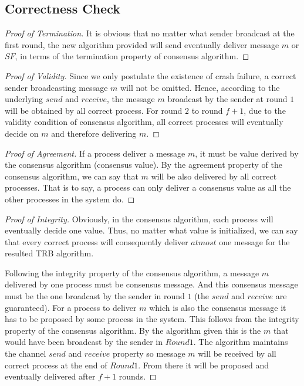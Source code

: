 \documentclass[11pt,a4paper]{article}
\begin{document}
\newpage
\subsection{Correctness Check}
\begin{proof}[Proof of Termination]
    It is obvious that no matter what sender broadcast at the first round, the
    new algorithm provided will send eventually deliver message $m$ or $SF$,
    in terms of the termination property of consensus algorithm.
\end{proof}
\begin{proof}[Proof of Validity]
Since we only postulate the existence of crash failure, a correct sender
broadcasting message $m$ will not be omitted. Hence, according to the
underlying $send$ and $receive$, the message $m$ broadcast by the sender at
 round $1$ will be obtained by all correct process. 
For round $2$ to round $f+1$, due to the validity condition of consensus
algorithm, all correct processes will eventually decide on $m$ and therefore delivering $m$.
\end{proof}
\begin{proof}[Proof of Agreement]
If a process deliver a message $m$, it must be value derived by the consensus
algorithm (consensus value). By the agreement 
property of the consensus algorithm, we can say that $m$ will be also
delivered by all correct processes. That is to say, a process can only deliver
a consensus value as all the other processes in the system do.
\end{proof}

\begin{proof}[Proof of Integrity]
Obviously, in the consensus algorithm, each process will eventually decide one
value.  Thus, no matter what value is initialized, we can say that every
correct process will consequently deliver $at most$ one message for the
resulted TRB algorithm.

Following the integrity property of the consensus algorithm, a message $m$
delivered by one process must be consensus message. And this consensus message
must be the one broadcast by the sender in round $1$ (the $send$ and
$receive$ are guaranteed).
For a process to deliver $m$ which is also the consensus message it has to be
proposed by some process in the system. This follows from the integrity
property of the consensus algorithm. By the algorithm given this is the $m$
that would have been broadcast by the sender in $Round 1$. The algorithm
maintains the channel $send$ and $receive$ property so message $m$ will be
received by all correct process at the end of $Round 1$. From there it will be
proposed and eventually delivered after $f+1$ rounds.
\end{proof}
\newpage
\end{document}
